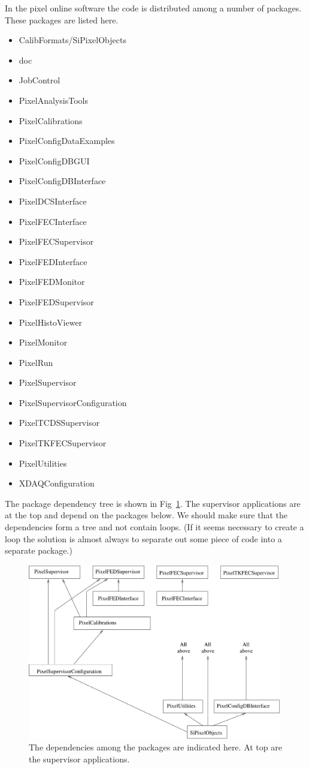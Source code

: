 In the pixel online software the code is distributed
among a number of packages. These packages are listed
here.
\begin{itemize}
\item CalibFormats/SiPixelObjects
\item doc
\item JobControl
\item PixelAnalysisTools
\item PixelCalibrations
\item PixelConfigDataExamples
\item PixelConfigDBGUI
\item PixelConfigDBInterface
\item PixelDCSInterface
\item PixelFECInterface
\item PixelFECSupervisor
\item PixelFEDInterface
\item PixelFEDMonitor
\item PixelFEDSupervisor
\item PixelHistoViewer
\item PixelMonitor
\item PixelRun
\item PixelSupervisor
\item PixelSupervisorConfiguration
\item PixelTCDSSupervisor
\item PixelTKFECSupervisor
\item PixelUtilities
\item XDAQConfiguration
\end{itemize}
The package dependency tree is shown in Fig~\ref{fig:dependencies}.
The supervisor applications are at the top and depend on the
packages below. We should make sure that the dependencies
form a tree and not contain loops. (If it seems necessary
to create a loop the solution is almost always to separate
out some piece of code into a separate package.)

\begin{figure}
\begin{center}
 \includegraphics[width=0.99\textwidth]{package_dep.pdf}
\end{center}
\caption{The dependencies among the packages are indicated here.
At top are the supervisor applications. }
\label{fig:dependencies}
\end{figure}

